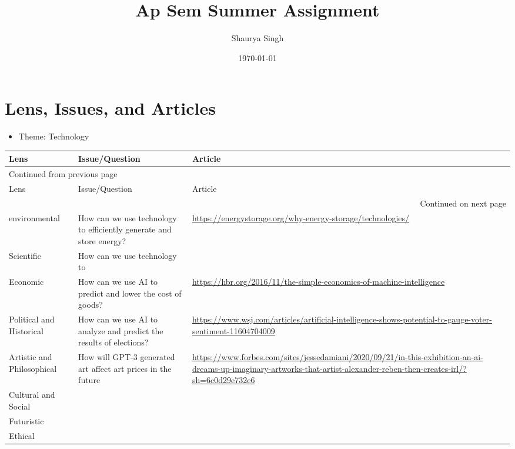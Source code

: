 \documentclass[11pt]{article}
\author{Shaurya Singh}
\date{\today}
\title{Ap Sem Summer Assignment}
\begin{document}
\maketitle
\setcounter{tocdepth}{1}
\tableofcontents


\section{Lens, Issues, and Articles}
\label{sec:org5faebe6}
\begin{itemize}
\item Theme: Technology
\end{itemize}

\begin{longtable}{|p{2.5cm}|p{6.5cm}|p{1cm}|}
Lens & Issue/Question & Article\\
\hline
\endfirsthead
\multicolumn{3}{l}{Continued from previous page} \\
\hline

Lens & Issue/Question & Article \\

\hline
\endhead
\hline\multicolumn{3}{r}{Continued on next page} \\
\endfoot
\endlastfoot
\hline
environmental & How can we use technology to efficiently generate and store energy? & \url{https://energystorage.org/why-energy-storage/technologies/}\\
\hline
Scientific & How can we use technology to & \\
\hline
Economic & How can we use AI to predict and lower the cost of goods? & \url{https://hbr.org/2016/11/the-simple-economics-of-machine-intelligence}\\
\hline
Political and Historical & How can we use AI to analyze and predict the results of elections? & \url{https://www.wsj.com/articles/artificial-intelligence-shows-potential-to-gauge-voter-sentiment-11604704009}\\
\hline
Artistic and Philosophical & How will GPT-3 generated art affect art prices in the future & \url{https://www.forbes.com/sites/jessedamiani/2020/09/21/in-this-exhibition-an-ai-dreams-up-imaginary-artworks-that-artist-alexander-reben-then-creates-irl/?sh=6c0d29e732e6}\\
\hline
Cultural and Social &  & \\
\hline
Futuristic &  & \\
\hline
Ethical &  & \\
\end{longtable}
\end{document}
